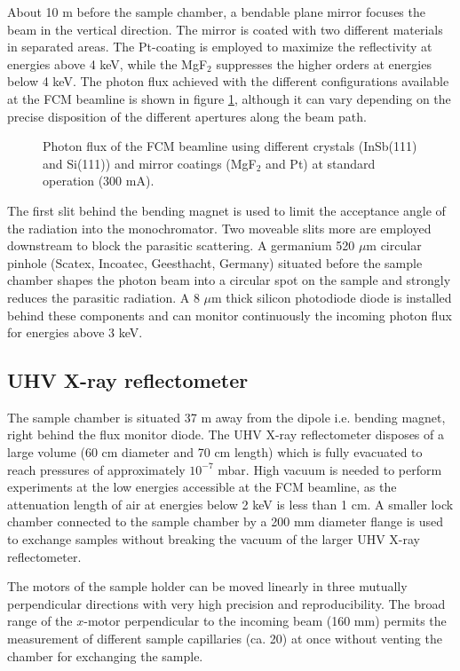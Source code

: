 About 10 m before the sample chamber, a bendable plane mirror focuses the beam in the vertical direction. The mirror is coated with two different materials in separated areas. The Pt-coating is employed to maximize the reflectivity at energies above 4 keV, while the MgF$_2$ suppresses the higher orders at energies below 4 keV. The photon flux achieved with the different configurations available at the FCM beamline is shown in figure \ref{fig:FCMBeamlineFlux}, although it can vary depending on the precise disposition of the different apertures along the beam path.

\begin{figure}%
	\centering
		
		\caption[Photon flux of the FCM beamline.]{Photon flux of the FCM beamline using different crystals (InSb(111) and Si(111)) and mirror coatings (MgF$_2$ and Pt) at standard operation (300 mA).}
		\label{fig:FCMBeamlineFlux}
\end{figure}

The first slit behind the bending magnet is used to limit the acceptance angle of the radiation into the monochromator. Two moveable slits more are employed downstream to block the parasitic scattering. A germanium 520 $\mu$m circular pinhole (Scatex, Incoatec, Geesthacht, Germany) situated before the sample chamber shapes the photon beam into a circular spot on the sample and strongly reduces the parasitic radiation. A 8 $\mu$m thick silicon photodiode diode is installed behind these components and can monitor continuously the incoming photon flux for energies above 3 keV.

\subsection{UHV X-ray reflectometer}

The sample chamber is situated 37 m away from the dipole i.e. bending magnet, right behind the flux monitor diode. The UHV X-ray reflectometer disposes of a large volume (60 cm diameter and 70 cm length) which is fully evacuated to reach pressures of approximately $10^{-7}$ mbar. High vacuum is needed to perform experiments at the low energies accessible at the FCM beamline, as the attenuation length of air at energies below 2 keV is less than 1 cm. A smaller lock chamber connected to the sample chamber by a 200 mm diameter flange is used to exchange samples without breaking the vacuum of the larger UHV X-ray reflectometer.

The motors of the sample holder can be moved linearly in three mutually perpendicular directions with very high precision and reproducibility. The broad range of the $x$-motor perpendicular to the incoming beam (160 mm) permits the measurement of different sample capillaries (ca. 20) at once without venting the chamber for exchanging the sample.

